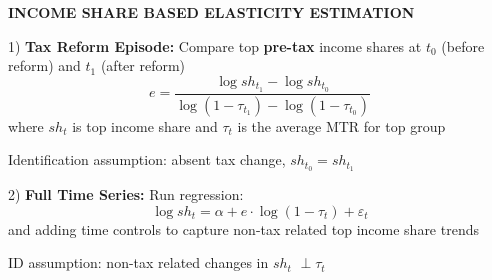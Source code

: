 \documentclass[landscape]{slides}
\begin{document}
%
%
%

%
%
%

\begin{slide}

\end{slide}




\begin{slide}
\begin{center}
{\bf INCOME SHARE BASED ELASTICITY ESTIMATION}
\end{center}
1) {\bf Tax Reform Episode:} Compare top \textbf{pre-tax} income shares at $t_0$
(before reform) and $t_1$ (after reform)
$$e=\frac{\log sh_{t_{1}}-\log sh_{t_{0}}}{\log (1-\tau
_{t_{1}})-\log (1-\tau _{t_{0}})}$$ where $sh_t$ is top income
share and $\tau_t$ is the average MTR for top group

Identification assumption: absent tax change, $sh_{t_0}=sh_{t_1}$

2) {\bf Full Time Series:} Run regression:
$$\log sh_{t}=\alpha+e\cdot \log (1-\tau_{t})+\varepsilon _{t}$$
and adding time controls to capture non-tax related top income
share trends

ID assumption: non-tax related changes in $sh_t$ $\perp \tau_t$
\end{slide}

\begin{slide}

\end{slide}

%
\end{document}
